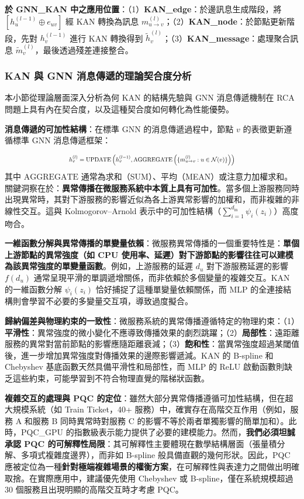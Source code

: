 \documentclass[10pt,a4paper,twocolumn]{article}
\begin{document}
\textbf{於 GNN\_KAN 中之應用位置}：（1）\textbf{KAN\_edge}：於邊訊息生成階段，將 $[h_u^{(l-1)} \oplus e_{uv}]$ 經 KAN 轉換為訊息 $m_{u \to v}^{(l)}$；（2）\textbf{KAN\_node}：於節點更新階段，先對 $h_v^{(l-1)}$ 進行 KAN 轉換得到 $\tilde{h}_v^{(l)}$；（3）\textbf{KAN\_message}：處理聚合訊息 $\tilde{m}_v^{(l)}$，最後透過殘差連接整合。

\subsubsection{KAN 與 GNN 消息傳遞的理論契合度分析}

本小節從理論層面深入分析為何 KAN 的結構先驗與 GNN 消息傳遞機制在 RCA 問題上具有內在契合度，以及這種契合度如何轉化為性能優勢。

\textbf{消息傳遞的可加性結構}：在標準 GNN 的消息傳遞過程中，節點 $v$ 的表徵更新遵循標準 GNN 消息傳遞框架：

\begin{equation}
\scalebox{0.73}{$h_v^{(l)} = \text{UPDATE}\left(h_v^{(l-1)}, \text{AGGREGATE}\left(\{m_{u \to v}^{(l)} : u \in \mathcal{N}(v)\}\right)\right)$}
\end{equation}
其中 $\text{AGGREGATE}$ 通常為求和（SUM）、平均（MEAN）或注意力加權求和。關鍵洞察在於：\textbf{異常傳播在微服務系統中本質上具有可加性}。當多個上游服務同時出現異常時，其對下游服務的影響近似為各上游異常影響的加權和，而非複雜的非線性交互。這與 Kolmogorov–Arnold 表示中的可加性結構（$\sum_{i=1}^{d_{\text{in}}} \psi_i(z_i)$）高度吻合。

\textbf{一維函數分解與異常傳播的單變量依賴}：微服務異常傳播的一個重要特性是：\textbf{單個上游節點的異常強度（如 CPU 使用率、延遲）對下游節點的影響往往可以建模為該異常強度的單變量函數}。例如，上游服務的延遲 $d_u$ 對下游服務延遲的影響 $f(d_u)$ 通常呈現平滑的單調遞增關係，而非依賴於多個變量的複雜交互。KAN 的一維函數分解 $\psi_i(z_i)$ 恰好捕捉了這種單變量依賴關係，而 MLP 的全連接結構則會學習不必要的多變量交互項，導致過度擬合。

\textbf{歸納偏差與物理約束的一致性}：微服務系統的異常傳播遵循特定的物理約束：（1）\textbf{平滑性}：異常強度的微小變化不應導致傳播效果的劇烈跳躍；（2）\textbf{局部性}：遠距離服務的異常對當前節點的影響應隨距離衰減；（3）\textbf{飽和性}：當異常強度超過某閾值後，進一步增加異常強度對傳播效果的邊際影響遞減。KAN 的 B-spline 和 Chebyshev 基底函數天然具備平滑性和局部性，而 MLP 的 ReLU 啟動函數則缺乏這些約束，可能學習到不符合物理直覺的階梯狀函數。

\textbf{複雜交互的處理與 PQC 的定位}：雖然大部分異常傳播遵循可加性結構，但在超大規模系統（如 Train Ticket，40+ 服務）中，確實存在高階交互作用（例如，服務 A 和服務 B 同時異常時對服務 C 的影響不等於兩者單獨影響的簡單加和）。此時，PQC\_GPU 的指數級表示能力提供了必要的建模能力。然而，\textbf{我們必須坦誠承認 PQC 的可解釋性局限}：其可解釋性主要體現在數學結構層面（張量積分解、多項式複雜度邊界），而非如 B-spline 般具備直觀的幾何形狀。因此，PQC 應被定位為一種\textbf{針對極端複雜場景的權衡方案}，在可解釋性與表達力之間做出明確取捨。在實際應用中，建議優先使用 Chebyshev 或 B-spline，僅在系統規模超過 30 個服務且出現明顯的高階交互時才考慮 PQC。
\end{document}
